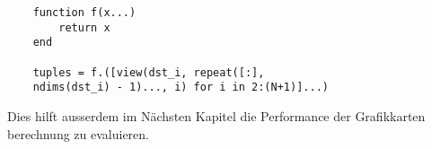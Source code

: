 





\begin{lstlisting}
	function f(x...)
		return x
	end
	
	tuples = f.([view(dst_i, repeat([:], 
	ndims(dst_i) - 1)..., i) for i in 2:(N+1)]...)
\end{lstlisting}









Dies hilft ausserdem im Nächsten Kapitel die Performance der Grafikkarten berechnung zu evaluieren.





